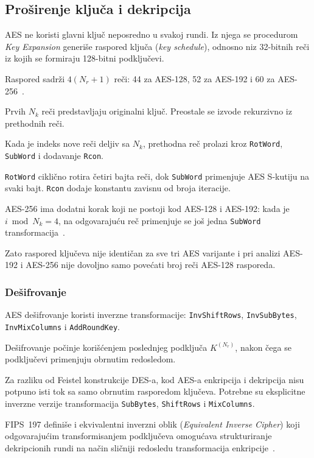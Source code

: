 \subsection{Proširenje ključa i dekripcija}
\label{subsec:aes_key_expansion}

AES ne koristi glavni ključ neposredno u svakoj rundi. Iz njega se
procedurom \emph{Key Expansion} generiše raspored ključa
(\emph{key schedule}), odnosno niz 32-bitnih reči iz kojih se formiraju
128-bitni podključevi.

Raspored sadrži $4(N_r+1)$ reči: 44 za AES-128, 52 za AES-192 i
60 za AES-256~\cite{fips197-2023}.

Prvih $N_k$ reči predstavljaju originalni ključ. Preostale se izvode
rekurzivno iz prethodnih reči.

Kada je indeks nove reči deljiv sa $N_k$, prethodna reč prolazi kroz
\texttt{RotWord}, \texttt{SubWord} i dodavanje \texttt{Rcon}.

\texttt{RotWord} ciklično rotira četiri bajta reči, dok
\texttt{SubWord} primenjuje AES S-kutiju na svaki bajt.
\texttt{Rcon} dodaje konstantu zavisnu od broja iteracije.

AES-256 ima dodatni korak koji ne postoji kod AES-128 i AES-192:
kada je
$i \bmod N_k = 4$,
na odgovarajuću reč primenjuje se još jedna
\texttt{SubWord} transformacija~\cite{fips197-2023}.

Zato raspored ključeva nije identičan za sve tri AES varijante i pri
analizi AES-192 i AES-256 nije dovoljno samo povećati broj reči
AES-128 rasporeda.


\subsubsection{Dešifrovanje}

AES dešifrovanje koristi inverzne transformacije:
\texttt{InvShiftRows}, \texttt{InvSubBytes}, \texttt{InvMixColumns} i \texttt{AddRoundKey}.

Dešifrovanje počinje korišćenjem poslednjeg podključa
$K^{(N_r)}$, nakon čega se podključevi primenjuju obrnutim redosledom.

Za razliku od Feistel konstrukcije DES-a, kod AES-a enkripcija i
dekripcija nisu potpuno isti tok sa samo obrnutim rasporedom ključeva.
Potrebne su eksplicitne inverzne verzije transformacija
\texttt{SubBytes}, \texttt{ShiftRows} i \texttt{MixColumns}.

FIPS~197 definiše i ekvivalentni inverzni oblik
(\emph{Equivalent Inverse Cipher}) koji odgovarajućim transformisanjem
podključeva omogućava strukturiranje dekripcionih rundi na način sličniji
redosledu transformacija enkripcije~\cite{fips197-2023}.


